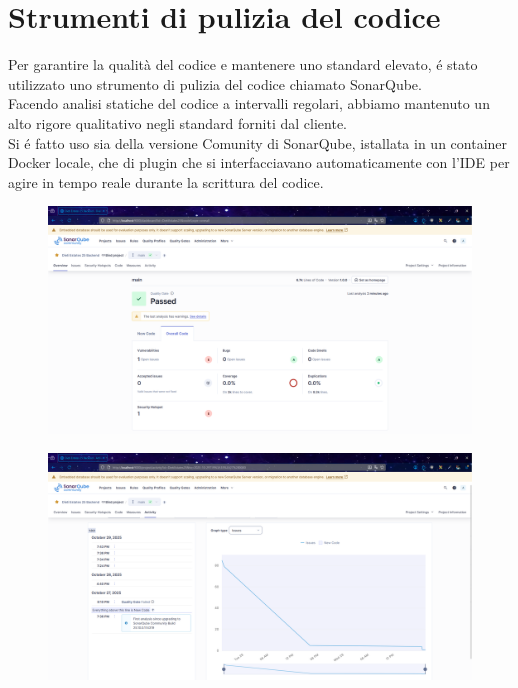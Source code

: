 \section{Strumenti di pulizia del codice}
Per garantire la qualità del codice e mantenere uno standard elevato, é stato utilizzato uno strumento di pulizia del codice chiamato SonarQube. 	\\
Facendo analisi statiche del codice a intervalli regolari, abbiamo mantenuto un alto rigore qualitativo negli standard forniti dal cliente.\\
Si é fatto uso sia della versione Comunity di SonarQube, istallata in un container Docker locale, che di plugin che si interfacciavano automaticamente con l'IDE per agire in tempo reale durante la scrittura del codice.\\
\begin{figure}[H]
	\centering
	\includegraphics[width=1\linewidth]{"Immagini/Sonarqube-overview.png"}
	\caption[Resoconto SonarQube]{}
	\label{fig:sonarqube-overview}
\end{figure}
\begin{figure}[H]
	\centering
	\includegraphics[width=1\linewidth]{"Immagini/Sonarqube-registo-attivita.png"}
	\caption[Attivitá sul codice SonarQube]{}
	\label{fig:sonarqube-registo-attivita}
\end{figure}